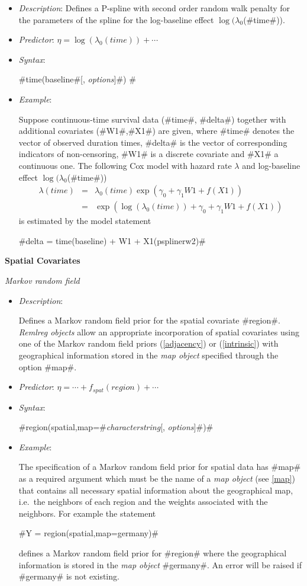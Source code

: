 \begin{itemize}
\item[] {\em Description}: Defines a P-spline with second order
random walk penalty for the parameters of the spline for the
log-baseline effect $\log(\lambda_0$(#time#)). \item[] {\em
Predictor}: $\eta = \log(\lambda_0(time)) + \cdots$ \item[] {\em
Syntax}:

#time(baseline#[, {\em options}]#) # \item[] {\em Example}:

Suppose continuous-time survival data (#time#, #delta#) together
with additional covariates (#W1#,#X1#) are given, where #time#
denotes the vector of observed duration times, #delta# is the
vector of corresponding indicators of non-censoring, #W1# is a
discrete covariate and #X1# a continuous one. The following Cox
model with hazard rate $\lambda$ and log-baseline effect
$\log(\lambda_0$(#time#))
\begin{eqnarray*}
 \lambda(time) & = & \lambda_0(time)\exp (\gamma_0 + \gamma_1 W1 + f(X1))\\
 & = & \exp\left(\log(\lambda_0(time)) + \gamma_0 + \gamma_1 W1 + f(X1)\right)
\end{eqnarray*}
is estimated by the model statement

#delta = time(baseline) + W1 + X1(psplinerw2)#

\end{itemize}

{\bf Spatial Covariates}
\medskip

{\em Markov random field}

\begin{itemize}
\item[] {\em Description}:

Defines a Markov random field prior for the spatial covariate
#region#. {\em Remlreg objects} allow an appropriate incorporation
of spatial covariates using one of the Markov random field priors
(\ref{adjacency}) or (\ref{intrinsic}) with geographical
information stored in the {\em map object} specified through the option
#map#.
\item[] {\em Predictor}: $\eta = \cdots + f_{spat}(region) + \cdots$
\item[] {\em Syntax}:

#region(spatial,map=#{\em characterstring}[, {\em options}]#)#
\item[] {\em Example}:

The specification of a Markov random field prior for spatial data
has #map# as a required argument which must be the name of a {\em
map object} (see \autoref{map}) that contains all necessary
spatial information about the geographical map, i.e.~the neighbors
of each region and the weights associated with the neighbors. For
example the statement

#Y = region(spatial,map=germany)#

defines a Markov random field prior for #region# where the
geographical information is stored in the {\em map object} #germany#. An
error will be raised if #germany# is not existing.
\end{itemize}


